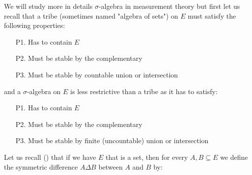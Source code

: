 	We will study more in details $\sigma$-algebra in measurement theory but first let us recall that a tribe (sometimes named "algebra of sets") on $E$ must satisfy the following properties:
	\begin{enumerate}
		\item[P1.] Has to contain $E$
		\item[P2.] Must be stable by the complementary
		\item[P3.] Must be stable by countable union or intersection
	\end{enumerate}
	and a $\sigma$-algebra on $E$ is less restrictive than a tribe as it has to satisfy:
	\begin{enumerate}
		\item[P1.] Has to contain $E$
		\item[P2.] Must be stable by the complementary
		\item[P3.] Must be stable by finite (uncountable) union or intersection
	\end{enumerate}
	Let us recall () that if we have $E$ that is a set, then for every $A,B\subseteq E$ we define the symmetric difference $A\Delta B$ between $A$ and $B$ by:
	
